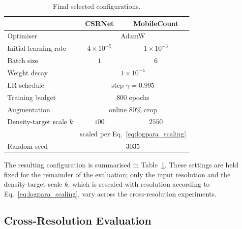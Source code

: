 \documentclass[conference]{IEEEtran}
\begin{document}
\begin{table}[t]
    \centering
    \caption{Final selected configurations.}
    \label{tab:final_configs}
    \begin{tabular}{lcc}
        \toprule
        & CSRNet & MobileCount \\
        \midrule
        Optimiser             & \multicolumn{2}{c}{AdamW} \\
        Initial learning rate & $4\times10^{-5}$ & $1\times10^{-3}$ \\
        Batch size            & $1$ & $6$ \\
        Weight decay          & \multicolumn{2}{c}{$1\times10^{-4}$} \\
        LR schedule           & \multicolumn{2}{c}{step $\gamma=0.995$} \\
        Training budget       & \multicolumn{2}{c}{$800$ epochs} \\
        Augmentation          & \multicolumn{2}{c}{online $80\%$ crop} \\
        Density-target scale $k$ & $100$ & $2550$ \\
        & \multicolumn{2}{c}{\footnotesize scaled per Eq.~\eqref{eq:logpara_scaling}} \\
        Random seed      & \multicolumn{2}{c}{$3035$} \\
        \bottomrule
    \end{tabular}
\end{table}

The resulting configuration is summarised in Table~\ref{tab:final_configs}.
These settings are held fixed for the remainder of the evaluation; only the
input resolution and the density-target scale $k$, which is rescaled with
resolution according to Eq.~\eqref{eq:logpara_scaling}, vary across the
cross-resolution experiments.

\subsection{Cross-Resolution Evaluation}
\label{subsec:res_resolution}
\end{document}
